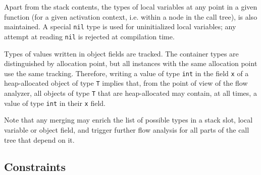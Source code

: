 Apart from the stack contents, the types of local variables at any point
in a given function (for a given activation context, i.e. within a node
in the call tree), is also maintained. A special \verb|nil| type is used
for uninitialized local variables; any attempt at reading \verb|nil| is
rejected at compilation time.

Types of values written in object fields are tracked. The container
types are distinguished by allocation point, but all instances with the
same allocation point use the same tracking. Therefore, writing a value
of type \verb|int| in the field \verb|x| of a heap-allocated object of
type \verb|T| implies that, from the point of view of the flow analyzer,
all objects of type \verb|T| that are heap-allocated may contain, at all
times, a value of type \verb|int| in their \verb|x| field.

Note that any merging may enrich the list of possible types in a stack
slot, local variable or object field, and trigger further flow analysis
for all parts of the call tree that depend on it.

\subsection{Constraints}


